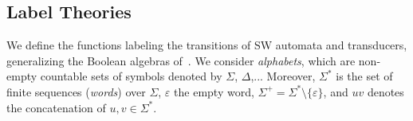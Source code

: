%
%
\subsection{Label Theories} 
We define the functions labeling the transitions of SW automata and transducers,
generalizing the Boolean algebras of~\cite{dAntoniVeanes17CAV}.
%
We consider \emph{alphabets}, which are non-empty countable 
sets of symbols
denoted by $\Sigma$, $\Delta$,...
Moreover, $\Sigma^*$ is the set of finite sequences (\emph{words}) over
$\Sigma$, $\varepsilon$ the empty word, $\Sigma^+ = \Sigma^* \setminus \{ \varepsilon \}$,
and $u v$ denotes the concatenation of $u, v \in \Sigma^*$.

